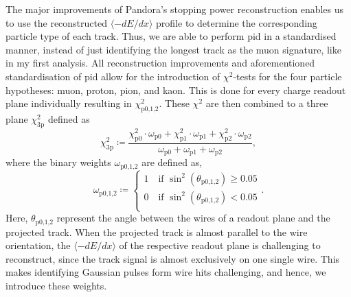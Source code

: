 The major improvements of \gls{Pandora}'s stopping power reconstruction enables us to use the reconstructed $\langle -dE/dx \rangle$ profile to determine the corresponding particle type of each track. Thus, we are able to perform \gls{pid} in a standardised manner, instead of just identifying the longest track as the muon signature, like in my first analysis. All reconstruction improvements and aforementioned standardisation of \gls{pid} allow for the introduction of $\chi^2$-tests for the four particle hypotheses: muon, proton, pion, and kaon. This is done for every charge readout plane individually resulting in $\chi^2_\textrm{p0,1,2}$. These $\chi^2$ are then combined to a three plane $\chi^2_\textrm{3p}$ defined as
\begin{equation}
    \label{eq:PID-Chi2}
    \chi^2_\textrm{3p} \coloneqq \dfrac{\chi^2_\textrm{p0} \cdot \omega_\textrm{p0} + \chi^2_\textrm{p1} \cdot \omega_\textrm{p1} + \chi^2_\textrm{p2} \cdot \omega_\textrm{p2}}{\omega_\textrm{p0} + \omega_\textrm{p1} + \omega_\textrm{p2}},
\end{equation}
where the binary weights $\omega_\textrm{p0,1,2}$ are defined as,
\begin{equation}
    \omega_\textrm{p0,1,2} \coloneqq
    \begin{cases}
        1 \quad \textrm{if } \sin^2(\theta_\textrm{p0,1,2}) \geq 0.05  \\
        0 \quad \textrm{if } \sin^2(\theta_\textrm{p0,1,2}) < 0.05  \\
    \end{cases}.
\end{equation}
Here, $\theta_\textrm{p0,1,2}$ represent the angle between the wires of a readout plane and the projected track. When the projected track is almost parallel to the wire orientation, the $\langle -dE/dx \rangle$ of the respective readout plane is challenging to reconstruct, since the track signal is almost exclusively on one single wire. This makes identifying Gaussian pulses form wire hits challenging, and hence, we introduce these weights.

